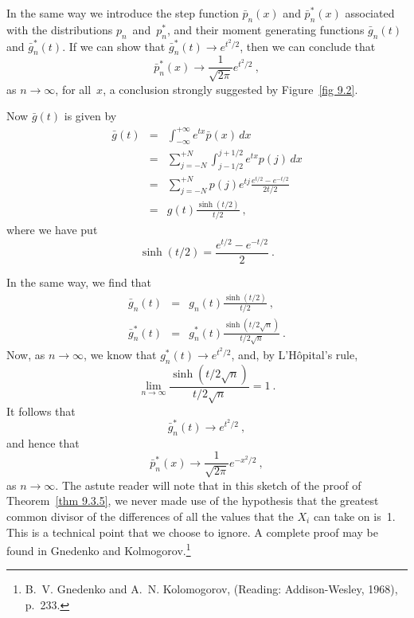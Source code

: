 In the same way we introduce the step function $\bar p_n(x)$ and
$\bar p_n^*(x)$ associated with the distributions $p_n$~and~$p_n^*$, and their
moment generating functions $\bar g_n(t)$ and $\bar g_n^*(t)$.  If we
can show that $\bar g_n^*(t) \to e^{t^2/2}$, then we can conclude that
$$
\bar p_n^*(x) \to \frac1{\sqrt{2\pi}} e^{t^2/2}\ ,
$$
as $n \rightarrow \infty$, for all~$x$, a conclusion strongly suggested by 
Figure~\ref{fig 9.2}.
\par
Now $\bar g(t)$ is given by
\begin{eqnarray*}
\bar g(t) &=& \int_{-\infty}^{+\infty} e^{tx} \bar p(x)\, dx \\
               &=& \sum_{j = -N}^{+N} \int_{j - 1/2}^{j + 1/2} e^{tx} p(j)\, dx\\
               &=& \sum_{j = -N}^{+N} p(j) e^{tj} \frac{e^{t/2} - e^{-t/2}}
{2t/2} \\
               &=& g(t) \frac{\sinh(t/2)}{t/2}\ ,
\end{eqnarray*}
where we have put
$$
\sinh(t/2) = \frac{e^{t/2} - e^{-t/2}}2\ .
$$
\par
In the same way, we find that
\begin{eqnarray*}
\bar g_n(t)   &=& g_n(t) \frac{\sinh(t/2)}{t/2}\ , \\
\bar g_n^*(t) &=& g_n^*(t) \frac{\sinh(t/2\sqrt n)}{t/2\sqrt n}\ .
\end{eqnarray*}
Now, as $n \to \infty$, we know that $g_n^*(t) \to e^{t^2/2}$, and, by
L'H\^opital's rule,
$$
\lim_{n \to \infty} \frac{\sinh(t/2\sqrt n)}{t/2\sqrt n} = 1\ .
$$
It follows that
$$
\bar g_n^*(t) \to e^{t^2/2}\ ,
$$
and hence that
$$
\bar p_n^*(x) \to \frac1{\sqrt{2\pi}} e^{-x^2/2}\ ,
$$
as $n \rightarrow \infty$.
The astute reader will note that in this sketch of the proof of Theorem~\ref{thm 9.3.5},
we never made use of the hypothesis that the greatest common divisor of the
differences of all the values that the $X_i$ can take on is~1.  This is a technical
point that we choose to ignore.  A complete proof may be found in Gnedenko and
Kolmogorov.\footnote{B.~V. Gnedenko and A.~N. Kolomogorov,  (Reading: Addison-Wesley, 1968), p.~233.}

